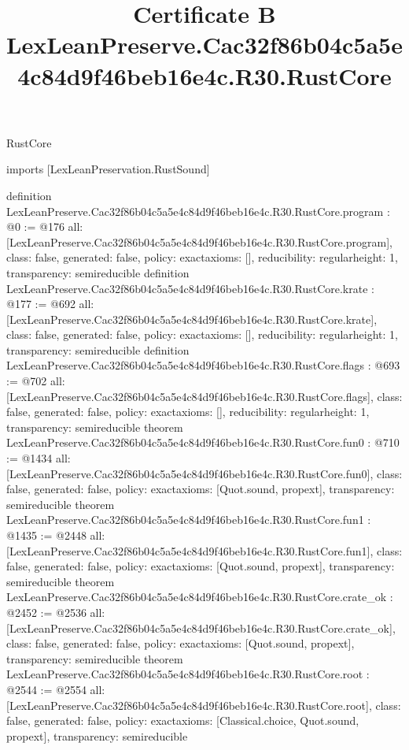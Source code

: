 \begin{lexlean}{RustCore}
\title{Certificate B LexLeanPreserve.Cac32f86b04c5a5e4c84d9f46beb16e4c.R30.RustCore}
\begin{coremodule}
imports [LexLeanPreservation.RustSound]

definition LexLeanPreserve.Cac32f86b04c5a5e4c84d9f46beb16e4c.R30.RustCore.program : @0 := @176 {
  all: [LexLeanPreserve.Cac32f86b04c5a5e4c84d9f46beb16e4c.R30.RustCore.program],
  class: false,
  generated: false,
  policy: exact{axioms: []},
  reducibility: regular{height: 1},
  transparency: semireducible
}
definition LexLeanPreserve.Cac32f86b04c5a5e4c84d9f46beb16e4c.R30.RustCore.krate : @177 := @692 {
  all: [LexLeanPreserve.Cac32f86b04c5a5e4c84d9f46beb16e4c.R30.RustCore.krate],
  class: false,
  generated: false,
  policy: exact{axioms: []},
  reducibility: regular{height: 1},
  transparency: semireducible
}
definition LexLeanPreserve.Cac32f86b04c5a5e4c84d9f46beb16e4c.R30.RustCore.flags : @693 := @702 {
  all: [LexLeanPreserve.Cac32f86b04c5a5e4c84d9f46beb16e4c.R30.RustCore.flags],
  class: false,
  generated: false,
  policy: exact{axioms: []},
  reducibility: regular{height: 1},
  transparency: semireducible
}
theorem LexLeanPreserve.Cac32f86b04c5a5e4c84d9f46beb16e4c.R30.RustCore.fun0 : @710 := @1434 {
  all: [LexLeanPreserve.Cac32f86b04c5a5e4c84d9f46beb16e4c.R30.RustCore.fun0],
  class: false,
  generated: false,
  policy: exact{axioms: [Quot.sound, propext]},
  transparency: semireducible
}
theorem LexLeanPreserve.Cac32f86b04c5a5e4c84d9f46beb16e4c.R30.RustCore.fun1 : @1435 := @2448 {
  all: [LexLeanPreserve.Cac32f86b04c5a5e4c84d9f46beb16e4c.R30.RustCore.fun1],
  class: false,
  generated: false,
  policy: exact{axioms: [Quot.sound, propext]},
  transparency: semireducible
}
theorem LexLeanPreserve.Cac32f86b04c5a5e4c84d9f46beb16e4c.R30.RustCore.crate_ok : @2452 := @2536 {
  all: [LexLeanPreserve.Cac32f86b04c5a5e4c84d9f46beb16e4c.R30.RustCore.crate_ok],
  class: false,
  generated: false,
  policy: exact{axioms: [Quot.sound, propext]},
  transparency: semireducible
}
theorem LexLeanPreserve.Cac32f86b04c5a5e4c84d9f46beb16e4c.R30.RustCore.root : @2544 := @2554 {
  all: [LexLeanPreserve.Cac32f86b04c5a5e4c84d9f46beb16e4c.R30.RustCore.root],
  class: false,
  generated: false,
  policy: exact{axioms: [Classical.choice, Quot.sound, propext]},
  transparency: semireducible
}


\end{coremodule}
\end{lexlean}
